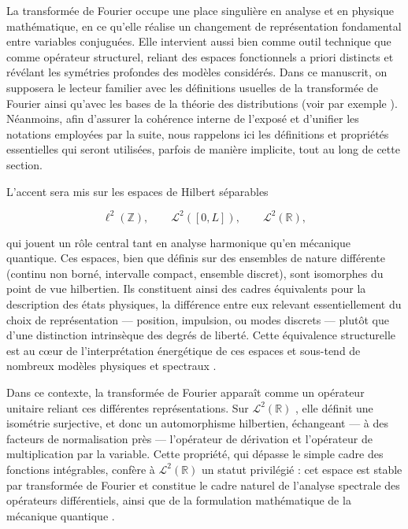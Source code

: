 La transformée de Fourier occupe une place singulière en analyse et en physique mathématique, en ce qu’elle réalise un changement de représentation fondamental entre variables conjuguées. Elle intervient aussi bien comme outil technique que comme opérateur structurel, reliant des espaces fonctionnels a priori distincts et révélant les symétries profondes des modèles considérés. Dans ce manuscrit, on supposera le lecteur familier avec les définitions usuelles de la transformée de Fourier ainsi qu’avec les bases de la théorie des distributions (voir par exemple \cite{AppelMathPhysiciens, GerardNotesFourier, BabadjianChap5, DeMarcayFourier, HareMQ}). Néanmoins, afin d’assurer la cohérence interne de l’exposé et d’unifier les notations employées par la suite, nous rappelons ici les définitions et propriétés essentielles qui seront utilisées, parfois de manière implicite, tout au long de cette section.

\smallskip

L’accent sera mis sur les espaces de Hilbert séparables

$$
\ell^2(\mathbb{Z}),\qquad \mathcal{L}^2([0,L]),\qquad \mathcal{L}^2(\mathbb{R}) ,
$$

qui jouent un rôle central tant en analyse harmonique qu’en mécanique quantique. Ces espaces, bien que définis sur des ensembles de nature différente (continu non borné, intervalle compact, ensemble discret), sont isomorphes du point de vue hilbertien. Ils constituent ainsi des cadres équivalents pour la description des états physiques, la différence entre eux relevant essentiellement du choix de représentation — position, impulsion, ou modes discrets — plutôt que d’une distinction intrinsèque des degrés de liberté. Cette équivalence structurelle est au cœur de l’interprétation énergétique de ces espaces et sous-tend de nombreux modèles physiques et spectraux \cite{AppelMathPhysiciens, GourdonAnalyse, GourdonAlgebre}.

\smallskip

Dans ce contexte, la transformée de Fourier apparaît comme un opérateur unitaire reliant ces différentes représentations. Sur  $\mathcal{L}^2(\mathbb{R})$ , elle définit une isométrie surjective, et donc un automorphisme hilbertien, échangeant — à des facteurs de normalisation près — l’opérateur de dérivation et l’opérateur de multiplication par la variable. Cette propriété, qui dépasse le simple cadre des fonctions intégrables, confère à  $\mathcal{L}^2(\mathbb{R})$ un statut privilégié : cet espace est stable par transformée de Fourier et constitue le cadre naturel de l’analyse spectrale des opérateurs différentiels, ainsi que de la formulation mathématique de la mécanique quantique \cite{AppelMathPhysiciens, HareMQ, cohen1973mecanique1, cohen1973mecanique2, cohen1973mecanique3}.

